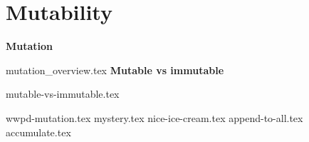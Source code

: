\documentclass{exam}
\begin{document}
\section{Mutability}
	\textbf{Mutation}

	{mutation_overview.tex}
	\textbf{Mutable vs immutable}

	{mutable-vs-immutable.tex}
	\begin{questions}
		{wwpd-mutation.tex}
		\newpage
		{mystery.tex}
		\newpage
    {nice-ice-cream.tex}
    \newpage
    {append-to-all.tex}
    {accumulate.tex}
	\end{questions}
\end{document}
